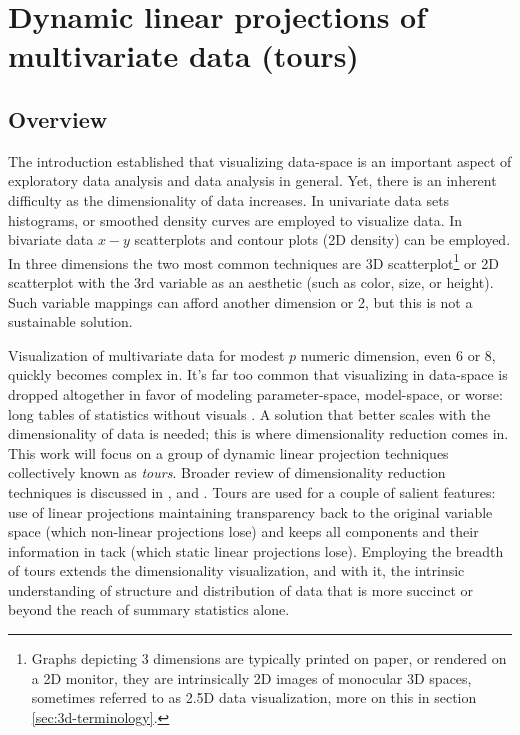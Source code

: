 \documentclass{monashthesis}
\begin{document}
\section{Dynamic linear projections of multivariate data
(tours)}\label{sec:tour}

\subsection{Overview}\label{overview}

The introduction established that visualizing data-space is an important
aspect of exploratory data analysis and data analysis in general. Yet,
there is an inherent difficulty as the dimensionality of data increases.
In univariate data sets histograms, or smoothed density curves are
employed to visualize data. In bivariate data \(x-y\) scatterplots and
contour plots (2D density) can be employed. In three dimensions the two
most common techniques are 3D
scatterplot\footnote{Graphs depicting 3 dimensions are typically printed on paper, or rendered on a 2D monitor, they are intrinsically 2D images of monocular 3D spaces, sometimes referred to as 2.5D data visualization, more on this in section \ref{sec:3d-terminology}.}
or 2D scatterplot with the 3rd variable as an aesthetic (such as color,
size, or height). Such variable mappings can afford another dimension or
2, but this is not a sustainable solution.

Visualization of multivariate data for modest \(p\) numeric dimension,
even 6 or 8, quickly becomes complex in. It's far too common that
visualizing in data-space is dropped altogether in favor of modeling
parameter-space, model-space, or worse: long tables of statistics
without visuals \autocite{wickham_visualizing_2015}. A solution that
better scales with the dimensionality of data is needed; this is where
dimensionality reduction comes in. This work will focus on a group of
dynamic linear projection techniques collectively known as \emph{tours}.
Broader review of dimensionality reduction techniques is discussed in
\textcite{grinstein_high-dimensional_2002}, and
\textcite{heer_tour_2010}. Tours are used for a couple of salient
features: use of linear projections maintaining transparency back to the
original variable space (which non-linear projections lose) and keeps
all components and their information in tack (which static linear
projections lose). Employing the breadth of tours extends the
dimensionality visualization, and with it, the intrinsic understanding
of structure and distribution of data that is more succinct or beyond
the reach of summary statistics alone.
\end{document}

